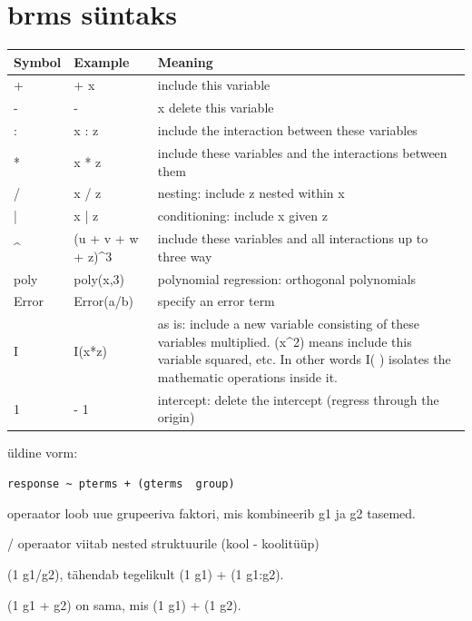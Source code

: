 \documentclass[]{book}
\providecommand{\tightlist}{%
  \setlength{\itemsep}{0pt}\setlength{\parskip}{0pt}}
\begin{document}
\chapter{brms süntaks}\label{brms-suntaks}

\begin{tabular}{l|l|l}
\hline
Symbol & Example & Meaning\\
\hline
+ & + x & include this variable\\
\hline
- & - & x   delete this variable\\
\hline
: & x : z & include the interaction between these variables\\
\hline
* & x * z & include these variables and the interactions between them\\
\hline
/ & x / z & nesting: include z nested within x\\
\hline
| & x | z & conditioning: include x given z\\
\hline
\textasciicircum{} & (u + v + w + z)\textasciicircum{}3 & include these variables and all interactions up to three way\\
\hline
poly & poly(x,3) & polynomial regression: orthogonal polynomials\\
\hline
Error & Error(a/b) & specify an error term\\
\hline
I & I(x*z) & as is: include a new variable consisting of these variables multiplied. (x\textasciicircum{}2) means include this variable squared, etc. In other words I( ) isolates the mathematic operations inside it.\\
\hline
1 & - 1 & intercept: delete the intercept (regress through the origin)\\
\hline
\end{tabular}

üldine vorm:

\texttt{response\ \textasciitilde{}\ pterms\ +\ (gterms\ \textbar{}\ group)}

\begin{description}
\tightlist
\item[kasuta g1:g2 või g1/g2, kui nii g1 kui g2 on sobilikud grupeerivad
faktorid.]
operaator loob uue grupeeriva faktori, mis kombineerib g1 ja g2 tasemed.
\end{description}

/ operaator viitab nested struktuurile (kool - koolitüüp)

(1 \textbar{} g1/g2), tähendab tegelikult (1 \textbar{} g1) + (1
\textbar{} g1:g2).

(1 \textbar{} g1 + g2) on sama, mis (1 \textbar{} g1) + (1 \textbar{}
g2).
\end{document}
